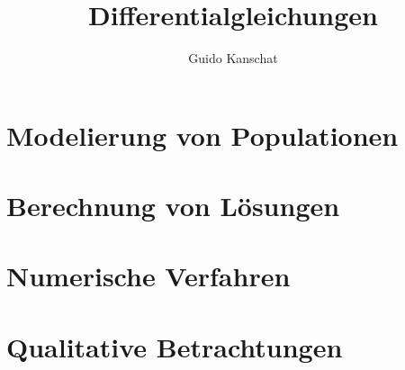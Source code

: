 \documentclass[notheorems,hidelinks,aspectratio=1610]{beamer}
\title{Differentialgleichungen}
\author{Guido Kanschat}
\date{}
\begin{document}
\frame{\maketitle}

\section{Modelierung von Populationen}
\frame{\sectoc}



\section{Berechnung von Lösungen}
\frame{\sectoc}



\section{Numerische Verfahren}
\frame{\sectoc}



\section{Qualitative Betrachtungen}
\frame{\sectoc}
\end{document}
